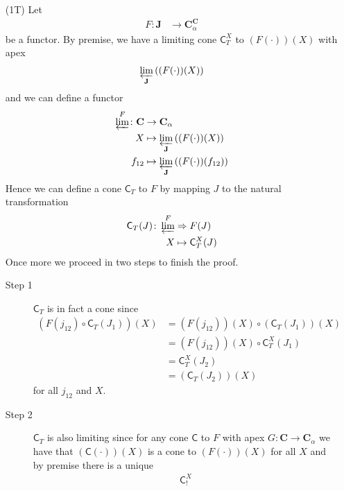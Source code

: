 \begin{prf}
\begin{enumerate}
\item[(1T)]
Let
\begin{align*}
  F
  \colon
  \mathbf{J}
  &\rightarrow
  \mathbf{C}_{\alpha}^{\mathbf{C}}
\end{align*}
be a functor. By premise, we have a limiting cone $\mathsf{C}_{T}^{X}$ to $(F(\cdot))(X)$ with apex
\begin{align*}
  \varprojlim_{\mathbf{J}}
  \left(
    (F(\cdot))(X)
  \right)
\end{align*}
and we can define a functor
\begin{align*}
  \varprojlim^{F}
  \colon
  \mathbf{C}
  &\rightarrow
  \mathbf{C}_{\alpha}
  \\
  X
  &\mapsto
  \varprojlim_{\mathbf{J}}
  \left(
    (F(\cdot))(X)
  \right)
  \\
  f_{12}
  &\mapsto
  \varprojlim_{\mathbf{J}}
  \left(
    (F(\cdot))(f_{12})
  \right)
\end{align*}
Hence we can define a cone $\mathsf{C}_{T}$ to $F$ by mapping $J$ to the natural transformation
\begin{align*}
  \mathsf{C}_{T}(J)
  \colon
  \varprojlim^{F}
  &\Rightarrow
  F(J)
  \\
  X
  &\mapsto
  \mathsf{C}_{T}^{X}(J)
\end{align*}
Once more we proceed in two steps to finish the proof.
\begin{description}
\item[Step 1]
$\mathsf{C}_{T}$ is in fact a cone since
\begin{align*}
  \left(
    F(j_{12})
    \circ
    \mathsf{C}_{T}(J_{1})
  \right)
  (X)
  &=
  (F(j_{12}))(X)
  \circ
  \left(
    \mathsf{C}_{T}(J_{1})
  \right)
  (X)
  \\
  &=
  (F(j_{12}))(X)
  \circ
  \mathsf{C}_{T}^{X}(J_{1})
  \\
  &=
  \mathsf{C}_{T}^{X}(J_{2})
  \\
  &=
  \left(
    \mathsf{C}_{T}(J_{2})
  \right)
  (X)
\end{align*}
for all $j_{12}$ and $X$.
\item[Step 2]
$\mathsf{C}_{T}$ is also limiting since for any cone $\mathsf{C}$ to $F$ with apex $G \colon \mathbf{C} \rightarrow \mathbf{C}_{\alpha}$ we have that $(\mathsf{C}(\cdot))(X)$ is a cone to $(F(\cdot))(X)$ for all $X$ and by premise there is a unique
\begin{align*}
  \mathsf{C}_{!}^{X}

\end{align*}
\end{description}
\end{enumerate}
\end{prf}
